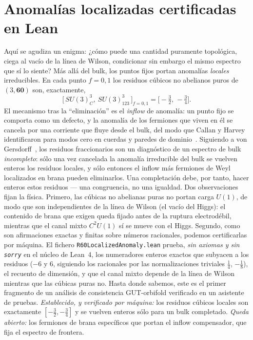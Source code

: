 \documentclass[11pt,a4paper]{article}
\begin{document}
\section{Anomal\'ias localizadas certificadas en Lean}\label{sec:localized}
Aqu\'i se agudiza un enigma: ¿c\'omo puede una cantidad puramente topol\'ogica, ciega al
vac\'io de la l\'inea de Wilson, condicionar sin embargo el mismo espectro que s\'i lo
siente? M\'as all\'a del bulk, los puntos fijos portan anomal\'ias \emph{locales}
irreducibles. En cada punto $f=0,1$ los residuos c\'ubicos no abelianos puros de
$(3,\mathbf{60})$ son, exactamente,
\begin{equation}
\big[\,SU(3)_C^3,\ SU(3)_{123}^3\,\big]_{f=0,1}=\Big[-\tfrac32,\,-\tfrac34\Big].
\end{equation}
El mecanismo tras la ``eliminaci\'on'' es el \emph{inflow} de anomal\'ia: un punto fijo se
comporta como un defecto, y la anomal\'ia de los fermiones que viven en \'el se cancela
por una corriente que fluye desde el bulk, del modo que Callan y Harvey identificaron para
modos cero en cuerdas y paredes de dominio~\cite{CallanHarvey}. Siguiendo a von
Gersdorff~\cite{GdV6D}, los residuos fraccionarios son un diagn\'ostico de un espectro de
bulk \emph{incompleto}: s\'olo una vez cancelada la anomal\'ia irreducible del bulk se
vuelven enteros los residuos locales, y s\'olo entonces el inflow m\'as fermiones de Weyl
localizados en brana pueden eliminarlos. Una completaci\'on debe, por tanto, hacer enteros
estos residuos --- una congruencia, no una igualdad. Dos observaciones fijan la f\'isica.
Primero, las c\'ubicas no abelianas puras no portan carga $U(1)$, de modo que son
independientes de la l\'inea de Wilson (el vac\'io del Higgs): el contenido de brana que
exigen queda fijado antes de la ruptura electrod\'ebil, mientras que el canal mixto
$C^2U(1)$ s\'i se mueve con el Higgs. Segundo, como son afirmaciones exactas y finitas
sobre n\'umeros racionales, podemos certificarlas por m\'aquina. El fichero
\texttt{R60LocalizedAnomaly.lean} prueba, \emph{sin axiomas y sin \texttt{sorry}} en el
n\'ucleo de Lean~4, los numeradores enteros exactos que subyacen a los residuos ($-6$ y
$6$, siguiendo los racionales por las normalizaciones triviales $\tfrac14$, $-\tfrac18$),
el recuento de dimensi\'on, y que el canal mixto depende de la l\'inea de Wilson mientras
que las c\'ubicas puras no. Hasta donde sabemos, este es el primer fragmento de un
an\'alisis de consistencia GUT-orbifold verificado en un asistente de pruebas.
\emph{Establecido, y verificado por m\'aquina:} los residuos c\'ubicos locales son
exactamente $[-\tfrac32,-\tfrac34]$ y se vuelven enteros s\'olo para un bulk completado.
\emph{Queda abierto:} los fermiones de brana espec\'ificos que portan el inflow
compensador, que fija el espectro de frontera.
\end{document}
